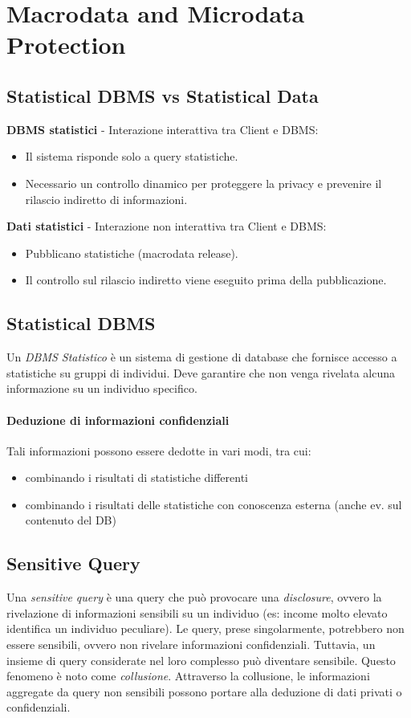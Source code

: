 \documentclass{report}
\begin{document}
\newpage

\section{Macrodata and Microdata Protection}

\subsection{Statistical DBMS vs Statistical Data}
\noindent \textbf{DBMS statistici} - Interazione interattiva tra Client e DBMS:
\begin{itemize}
    \item Il sistema risponde solo a query statistiche.
    \item Necessario un controllo dinamico per proteggere la privacy e prevenire il rilascio indiretto di informazioni.
\end{itemize}

\noindent \textbf{Dati statistici} - Interazione non interattiva tra Client e DBMS:
\begin{itemize}
    \item Pubblicano statistiche (macrodata release).
    \item Il controllo sul rilascio indiretto viene eseguito prima della pubblicazione.
\end{itemize}

\subsection{Statistical DBMS}
Un \textit{DBMS Statistico} è un sistema di gestione di database che fornisce accesso a statistiche su gruppi di individui. 
Deve garantire che non venga rivelata alcuna informazione su un individuo specifico.

\paragraph{Deduzione di informazioni confidenziali}
Tali informazioni possono essere dedotte in vari modi, tra cui:
\begin{itemize}
    \item combinando i risultati di statistiche differenti
    \item combinando i risultati delle statistiche con conoscenza esterna (anche ev. sul contenuto del DB)
\end{itemize}

\subsection{Sensitive Query}
Una \textit{sensitive query} è una query che può provocare una \textit{disclosure}, ovvero la rivelazione di informazioni sensibili su un individuo (es: income molto elevato identifica un individuo peculiare).
Le query, prese singolarmente, potrebbero non essere sensibili, ovvero non rivelare informazioni confidenziali. 
Tuttavia, un insieme di query considerate nel loro complesso può diventare sensibile. Questo fenomeno è noto come \textit{collusione}. 
Attraverso la collusione, le informazioni aggregate da query non sensibili possono portare alla deduzione di dati privati o confidenziali.
\end{document}
